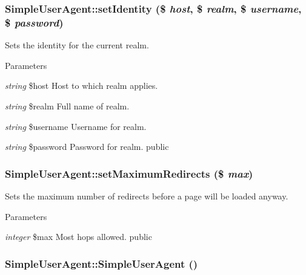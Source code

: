 \hypertarget{class_simple_user_agent_a17aa7c374babcc447bfee05499abafb9}{
\subsubsection[{setIdentity}]{\setlength{\rightskip}{0pt plus 5cm}SimpleUserAgent::setIdentity (\$ {\em host}, \/  \$ {\em realm}, \/  \$ {\em username}, \/  \$ {\em password})}}
\label{class_simple_user_agent_a17aa7c374babcc447bfee05499abafb9}
Sets the identity for the current realm. 
\begin{DoxyParams}{Parameters}
\item[{\em string}]\$host Host to which realm applies. \item[{\em string}]\$realm Full name of realm. \item[{\em string}]\$username Username for realm. \item[{\em string}]\$password Password for realm.  public \end{DoxyParams}
\hypertarget{class_simple_user_agent_aa0040a11b72b187848479065f14eff27}{
\subsubsection[{setMaximumRedirects}]{\setlength{\rightskip}{0pt plus 5cm}SimpleUserAgent::setMaximumRedirects (\$ {\em max})}}
\label{class_simple_user_agent_aa0040a11b72b187848479065f14eff27}
Sets the maximum number of redirects before a page will be loaded anyway. 
\begin{DoxyParams}{Parameters}
\item[{\em integer}]\$max Most hops allowed.  public \end{DoxyParams}
\hypertarget{class_simple_user_agent_a7514052c18df5e800786dbca132fd0f9}{
\subsubsection[{SimpleUserAgent}]{\setlength{\rightskip}{0pt plus 5cm}SimpleUserAgent::SimpleUserAgent ()}}
\label{class_simple_user_agent_a7514052c18df5e800786dbca132fd0f9}
